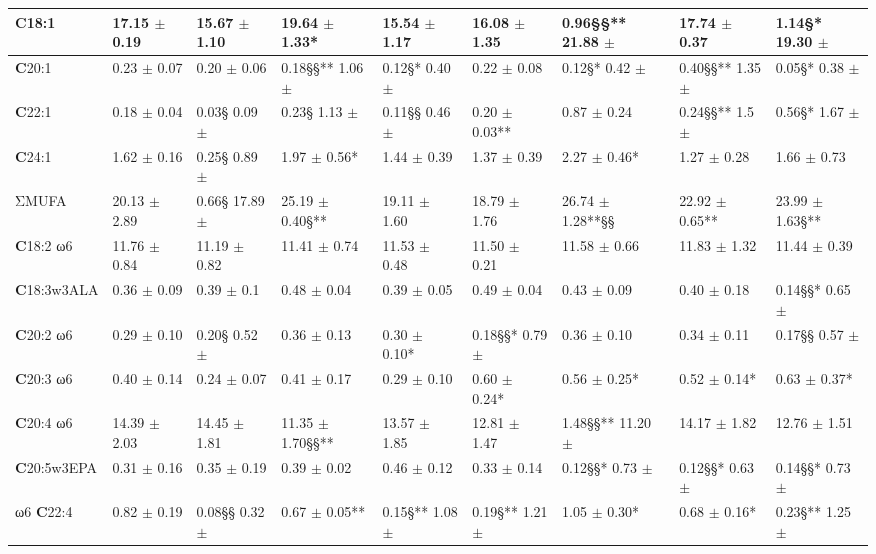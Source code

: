 \documentclass[11pt]{article}
\begin{document}
\begin{table}
\begin{tabular}{|l|l|l|l|l|l|l|l|l|}
\hline
\textbf{C}18:1 & 17.15 $\pm$ 0.19 & 15.67 $\pm$ 1.10 & 19.64 $\pm$ 1.33* & 15.54 $\pm$ 1.17 & 16.08 $\pm$ 1.35 & 0.96§§** 21.88 $\pm$ & 17.74 $\pm$ 0.37 & 1.14§* 19.30 $\pm$ \\
\hline
\textbf{C}20:1 & 0.23 $\pm$ 0.07 & 0.20 $\pm$ 0.06 & 0.18§§** 1.06 $\pm$ & 0.12§* 0.40 $\pm$ & 0.22 $\pm$ 0.08 & 0.12§* 0.42 $\pm$ & 0.40§§** 1.35 $\pm$ & 0.05§* 0.38 $\pm$ \\
\hline
\textbf{C}22:1 & 0.18 $\pm$ 0.04 & 0.03§ 0.09 $\pm$ & 0.23§ 1.13 $\pm$ & 0.11§§ 0.46 $\pm$ & 0.20 $\pm$ 0.03** & 0.87 $\pm$ 0.24 & 0.24§§** 1.5 $\pm$ & 0.56§* 1.67 $\pm$ \\
\hline
\textbf{C}24:1 & 1.62 $\pm$ 0.16 & 0.25§ 0.89 $\pm$ & 1.97 $\pm$ 0.56* & 1.44 $\pm$ 0.39 & 1.37 $\pm$ 0.39 & 2.27 $\pm$ 0.46* & 1.27 $\pm$ 0.28 & 1.66 $\pm$ 0.73 \\
\hline
ΣMUFA & 20.13 $\pm$ 2.89 & 0.66§ 17.89 $\pm$ & 25.19 $\pm$ 0.40§** & 19.11 $\pm$ 1.60 & 18.79 $\pm$ 1.76 & 26.74 $\pm$ 1.28**§§ & 22.92 $\pm$ 0.65** & 23.99 $\pm$ 1.63§** \\
\hline
\textbf{C}18:2 ω6 & 11.76 $\pm$ 0.84 & 11.19 $\pm$ 0.82 & 11.41 $\pm$ 0.74 & 11.53 $\pm$ 0.48 & 11.50 $\pm$ 0.21 & 11.58 $\pm$ 0.66 & 11.83 $\pm$ 1.32 & 11.44 $\pm$ 0.39 \\
\hline
\textbf{C}18:3w3ALA & 0.36 $\pm$ 0.09 & 0.39 $\pm$ 0.1 & 0.48 $\pm$ 0.04 & 0.39 $\pm$ 0.05 & 0.49 $\pm$ 0.04 & 0.43 $\pm$ 0.09 & 0.40 $\pm$ 0.18 & 0.14§§* 0.65 $\pm$ \\
\hline
\textbf{C}20:2 ω6 & 0.29 $\pm$ 0.10 & 0.20§ 0.52 $\pm$ & 0.36 $\pm$ 0.13 & 0.30 $\pm$ 0.10* & 0.18§§* 0.79 $\pm$ & 0.36 $\pm$ 0.10 & 0.34 $\pm$ 0.11 & 0.17§§ 0.57 $\pm$ \\
\hline
\textbf{C}20:3 ω6 & 0.40 $\pm$ 0.14 & 0.24 $\pm$ 0.07 & 0.41 $\pm$ 0.17 & 0.29 $\pm$ 0.10 & 0.60 $\pm$ 0.24* & 0.56 $\pm$ 0.25* & 0.52 $\pm$ 0.14* & 0.63 $\pm$ 0.37* \\
\hline
\textbf{C}20:4 ω6 & 14.39 $\pm$ 2.03 & 14.45 $\pm$ 1.81 & 11.35 $\pm$ 1.70§§** & 13.57 $\pm$ 1.85 & 12.81 $\pm$ 1.47 & 1.48§§** 11.20 $\pm$ & 14.17 $\pm$ 1.82 & 12.76 $\pm$ 1.51 \\
\hline
\textbf{C}20:5w3EPA & 0.31 $\pm$ 0.16 & 0.35 $\pm$ 0.19 & 0.39 $\pm$ 0.02 & 0.46 $\pm$ 0.12 & 0.33 $\pm$ 0.14 & 0.12§§* 0.73 $\pm$ & 0.12§§* 0.63 $\pm$ & 0.14§§* 0.73 $\pm$ \\
\hline
ω6 \textbf{C}22:4 & 0.82 $\pm$ 0.19 & 0.08§§ 0.32 $\pm$ & 0.67 $\pm$ 0.05** & 0.15§** 1.08 $\pm$ & 0.19§** 1.21 $\pm$ & 1.05 $\pm$ 0.30* & 0.68 $\pm$ 0.16* & 0.23§** 1.25 $\pm$ \\

\end{tabular}
\end{table}
\end{document}
